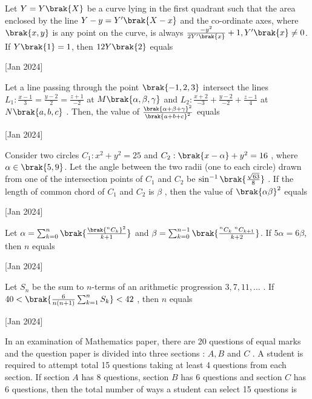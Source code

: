  \iffalse
  \title{2024}
  \author{EE24BTECH11010}
  \section{integer}
\fi
 \item Let $Y = Y\brak{X}$
 be a curve lying in the first quadrant such that the area enclosed by the line $Y - y = Y^{\prime}\brak{X - x}$
 and the co-ordinate axes, where $\brak{x,y}$
 is any point on the curve, is always $ \frac{-y^2}{2Y^{\prime}\brak{x}} + 1, Y^{\prime}\brak{x} \ne 0$. If $Y\brak{1} = 1$, then $12Y\brak{2}$
 equals 

 \hfill[Jan 2024]

 \item Let a line passing through the point $\brak{-1,2,3}$ intersect the lines $L_1 : \frac{x-1}{3} = \frac{y-2}{2} = \frac{z+1}{-2}$ 
 at $M\brak{\alpha, \beta, \gamma}$
 and $L_2 : \frac{x+2}{-3} + \frac{y-2}{-2} + \frac{z-1}{4}$ at $N\brak{a,b,c}$
. Then, the value of $\frac{\brak{\alpha+\beta + \gamma}^2}{\brak{a + b + c}^2}$
 equals

 \hfill[Jan 2024]

 \item Consider two circles $C_1 : x^2 + y^2 = 25$
 and $C_2 : \brak{x - \alpha} + y^2 = 16$
, where $\alpha \in \brak{5,9}$. Let the angle between the two radii (one to each circle) drawn from one of the intersection points of $C_1$
 and $C_2$
 be $\sin ^{-1} \brak{\frac{\sqrt{63}}{8}}$
. If the length of common chord of $C_1$
 and $C_2$
 is $\beta$
, then the value of $\brak{\alpha\beta}^2$
 equals

 \hfill[Jan 2024]
 \item Let $\alpha = \sum_{k = 0}^n \brak{\frac{\brak{^nC_k}^2}{k+1}}$ and $\beta = \sum_{k = 0}^{n-1} \brak{\frac{^nC_k\text{ } ^nC_{k+1}}{k+2}}$. If $5\alpha = 6\beta$, then $n$ equals 
 
 \hfill [Jan 2024]

 \item Let $S_n$
 be the sum to $n$-terms of an arithmetic progression $3,7,11, \ldots $
 . If $40 < \brak{\frac{6}{n(n+1)} \sum_{k = 1}^n S_k} < 42$
, then $n$
 equals 

 \hfill[Jan 2024]

 \item In an examination of Mathematics paper, there are 20 questions of equal marks and the question paper is divided into three sections : $A,B$
 and $C$
. A student is required to attempt total 15 questions taking at least 4 questions from each section. If section $A$
 has 8 questions, section $B$
 has 6 questions and section $C$
 has 6 questions, then the total number of ways a student can select 15 questions is 

